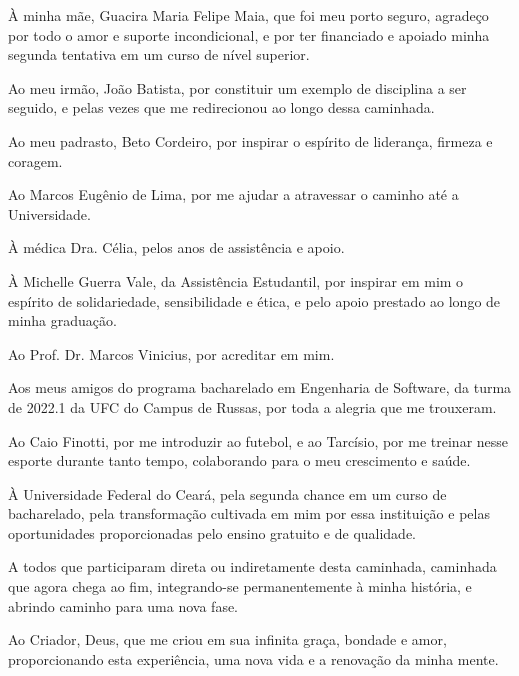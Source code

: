 \begin{agradecimentos}

À minha mãe, Guacira Maria Felipe Maia, que foi meu porto seguro, agradeço por todo o amor e suporte incondicional, e por ter financiado e apoiado minha segunda tentativa em um curso de nível superior.

Ao meu irmão, João Batista, por constituir um exemplo de disciplina a ser seguido, e pelas vezes que me redirecionou ao longo dessa caminhada.

Ao meu padrasto, Beto Cordeiro, por inspirar o espírito de liderança, firmeza e coragem.

Ao Marcos Eugênio de Lima, por me ajudar a atravessar o caminho até a Universidade.

À médica Dra. Célia, pelos anos de assistência e apoio.

À Michelle Guerra Vale, da Assistência Estudantil, por inspirar em mim o espírito de solidariedade, sensibilidade e ética, e pelo apoio prestado ao longo de minha graduação.

Ao Prof. Dr. Marcos Vinicius, por acreditar em mim.

Aos meus amigos do programa bacharelado em Engenharia de Software, da turma de 2022.1 da UFC do Campus de Russas, por toda a alegria que me trouxeram.

Ao Caio Finotti, por me introduzir ao futebol, e ao Tarcísio, por me treinar nesse esporte durante tanto tempo, colaborando para o meu crescimento e saúde.

À Universidade Federal do Ceará, pela segunda chance em um curso de bacharelado, pela transformação cultivada em mim por essa instituição e pelas oportunidades proporcionadas pelo ensino gratuito e de qualidade.

A todos que participaram direta ou indiretamente desta caminhada, caminhada que agora chega ao fim, integrando-se permanentemente à minha história, e abrindo caminho para uma nova fase.

Ao Criador, Deus, que me criou em sua infinita graça, bondade e amor, proporcionando esta experiência, uma nova vida e a renovação da minha mente.

\end{agradecimentos}

